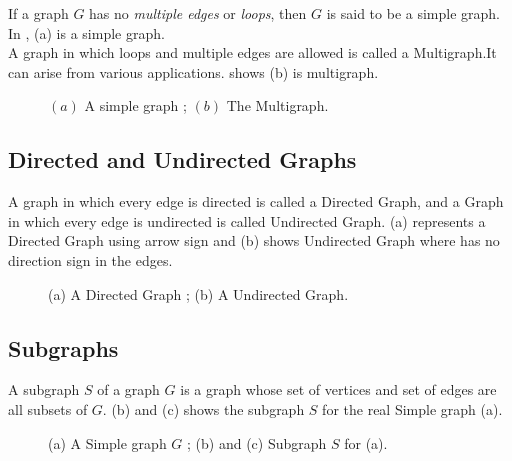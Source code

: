 If a graph $G$ has no \emph{multiple edges} or \emph{loops}, then $G$ is said to be a
simple graph. In , (a) is a simple graph.
\\
A graph in which loops and multiple edges are allowed is called a Multigraph.It can arise from various applications. shows (b) is multigraph. 




\begin{figure}[!tb]
  \centering
\resizebox{100mm}{!}{}
\caption{$(a)$ A simple graph ; $(b)$  The Multigraph.}
\label{fig:simple_multi}
\end{figure}





\subsection{Directed and Undirected Graphs}

A graph in which every edge is directed is called a Directed Graph, and a Graph in which every edge is undirected is called Undirected Graph.  (a) represents a Directed Graph using arrow sign and (b) shows Undirected Graph where has no direction sign in the edges.


\begin{figure}[!tb]
  \centering
\resizebox{80mm}{!}{}
\caption{(a) A Directed Graph ; (b) A Undirected Graph.}
\label{fig:direct_undirect}
\end{figure}




\subsection{Subgraphs}
A subgraph $S$ of a graph $G$ is a graph whose set of vertices and set of edges are all subsets of $G$.  (b) and (c) shows the subgraph $S$ for the real Simple graph (a).


\begin{figure}[!tb]
  \centering
\resizebox{100mm}{!}{}
\caption{(a) A Simple graph $G$ ; (b) and (c) Subgraph $S$ for (a).}
\label{fig:subgraph}
\end{figure}







